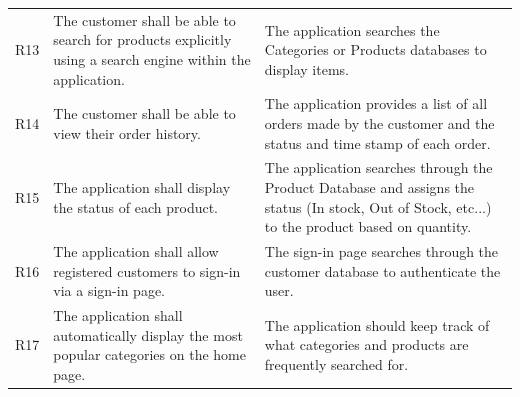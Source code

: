 \documentclass[12pt]{article}
\begin{document}
\begin{myspace}{1.7}
\begin{table}[]
\begin{tabular}{| p{.5cm}|p{9cm} |p{5cm}|}
R13 & The customer shall be able to search for products explicitly using a search engine within the application.                                                                                                                                                                                             & The application searches the Categories or Products databases to display items.                                                                                                                                                                                              \\
R14 & The customer shall be able to view their order history.                                                                                                                                                                                                                                                & The application provides a list of all orders made by the customer and the status and time stamp of each order.                                                                                                                                                              \\
R15 & The application shall display the status of each product.                                                                                                                                                                                                                                              & The application searches through the Product Database and assigns the status (In stock, Out of Stock, etc...) to the product based on quantity.                                                                                                                              \\
R16 & The application shall allow registered customers to sign-in via a sign-in page.                                                                                                                                                                                                                        & The sign-in page searches through the customer database to authenticate the user.                                                                                                                                                                                            \\
R17 & The application shall automatically display the most popular categories on the home page.                                                                                                                                                                                                              & The application should keep track of what categories and products are frequently searched for.                                                                                                                                                                               \\

\end{tabular}
\end{table}
\end{myspace}
\end{document}
